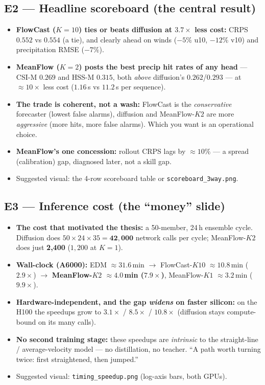 \documentclass[11pt]{article}
\begin{document}
\subsection*{E2 --- Headline scoreboard (the central result)}
\begin{itemize}
  \item \textbf{FlowCast ($K{=}10$) ties or beats diffusion at $3.7\times$ less
        cost:} CRPS $0.552$ vs $0.554$ (a tie), and clearly ahead on winds
        ($-5\%$ u10, $-12\%$ v10) and precipitation RMSE ($-7\%$).
  \item \textbf{MeanFlow ($K{=}2$) posts the best precip hit rates of any head}
        --- CSI-M $0.269$ and HSS-M $0.315$, both \emph{above} diffusion's
        $0.262$/$0.293$ --- at \textbf{$\approx 10\times$} less cost
        ($1.16$\,s vs $11.2$\,s per sequence).
  \item \textbf{The trade is coherent, not a wash:} FlowCast is the
        \emph{conservative} forecaster (lowest false alarms), diffusion and
        MeanFlow-$K2$ are more \emph{aggressive} (more hits, more false alarms).
        Which you want is an operational choice.
  \item \textbf{MeanFlow's one concession:} rollout CRPS lags by $\approx 10\%$
        --- a spread (calibration) gap, diagnosed later, not a skill gap.
  \item Suggested visual: the 4-row scoreboard table or
        \texttt{scoreboard\_3way.png}.
\end{itemize}

\subsection*{E3 --- Inference cost (the ``money'' slide)}
\begin{itemize}
  \item \textbf{The cost that motivated the thesis:} a 50-member, 24\,h ensemble
        cycle. Diffusion does $50{\times}24{\times}35 = \mathbf{42{,}000}$
        network calls per cycle; MeanFlow-$K2$ does just \textbf{2{,}400}
        ($1{,}200$ at $K{=}1$).
  \item \textbf{Wall-clock (A6000):} EDM $\approx 31.6$\,min $\rightarrow$
        FlowCast-$K10$ $\approx 10.8$\,min ($2.9\times$) $\rightarrow$
        \textbf{MeanFlow-$K2$ $\approx 4.0$\,min ($7.9\times$)},
        MeanFlow-$K1$ $\approx 3.2$\,min ($9.9\times$).
  \item \textbf{Hardware-independent, and the gap \emph{widens} on faster
        silicon:} on the H100 the speedups grow to $3.1\times$ / $8.5\times$ /
        $\mathbf{10.8\times}$ (diffusion stays compute-bound on its many calls).
  \item \textbf{No second training stage:} these speedups are \emph{intrinsic}
        to the straight-line / average-velocity model --- no distillation, no
        teacher. ``A path worth turning twice: first straightened, then jumped.''
  \item Suggested visual: \texttt{timing\_speedup.png} (log-axis bars, both GPUs).
\end{itemize}
\end{document}
